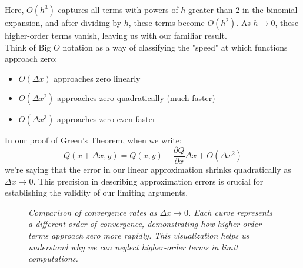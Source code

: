 \noindent Here, $O(h^3)$ captures all terms with powers of $h$ greater than 2 in the binomial expansion, and after dividing by $h$, these terms become $O(h^2)$. As $h \to 0$, these higher-order terms vanish, leaving us with our familiar result. \\

\noindent Think of Big $O$ notation as a way of classifying the "speed" at which functions approach zero:
\begin{itemize}
   \item $O(\Delta x)$ approaches zero linearly
   \item $O(\Delta x^2)$ approaches zero quadratically (much faster)
   \item $O(\Delta x^3)$ approaches zero even faster
\end{itemize}

\noindent In our proof of Green's Theorem, when we write:
\[
Q(x+\Delta x,y) = Q(x,y) + \frac{\partial Q}{\partial x}\Delta x + O(\Delta x^2)
\]
we're saying that the error in our linear approximation shrinks quadratically as $\Delta x \to 0$. This precision in describing approximation errors is crucial for establishing the validity of our limiting arguments.

\begin{figure}[H]
\centering
{}
\caption{\textit{Comparison of convergence rates as $\Delta x \to 0$. Each curve represents a different order of convergence, demonstrating how higher-order terms approach zero more rapidly. This visualization helps us understand why we can neglect higher-order terms in limit computations.}}
\label{fig:big_o}
\end{figure}

